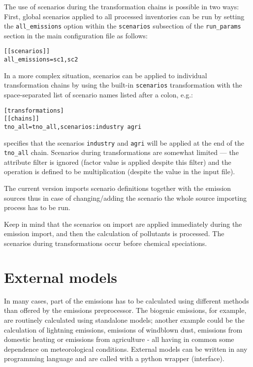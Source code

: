 \documentclass[a4paper,11pt]{article}
\begin{document}
The use of scenarios during the transformation chains is possible in two ways:
First, global scenarios applied to all processed inventories can be run by
setting the \verb|all_emissions| option within the \verb|scenarios| subsection of the \verb|run_params| section in the main configuration file
as follows:
\begin{verbatim}
[[scenarios]]
all_emissions=sc1,sc2
\end{verbatim}

In a more complex situation, scenarios can be applied to individual
transformation chains by using the built-in \verb|scenarios| transformation with the
space-separated list of scenario names listed after a colon, e.g.:

\begin{verbatim}
[transformations]
[[chains]]
tno_all=tno_all,scenarios:industry agri
\end{verbatim}

specifies that the scenarios \verb|industry| and \verb|agri| will be applied
at the end of the \verb|tno_all| chain. Scenarios during transformations are somewhat limited --- the attribute filter is ignored (factor value is applied despite this filter) and the operation is defined to be multiplication (despite the value in the input file).

The current version imports scenario definitions together with the emission sources thus in case of changing/adding the scenario the whole source importing process has to be run. 

Keep in mind that the scenarios on import are applied immediately during the emission import, and then the calculation of pollutants is processed. The scenarios during transformations occur before chemical speciations.



\section{External models}\label{external-models}

In many cases, part of the emissions has to be calculated using
different methods than offered by the emissions preprocessor. The
biogenic emissions, for example, are routinely calculated using standalone models;
another example could be the calculation of lightning emissions, emissions of windblown dust,
emissions from domestic heating or emissions from agriculture - all
having in common some dependence on meteorological conditions. External
models can be written in any programming language and are called with a
python wrapper (interface).
\end{document}
